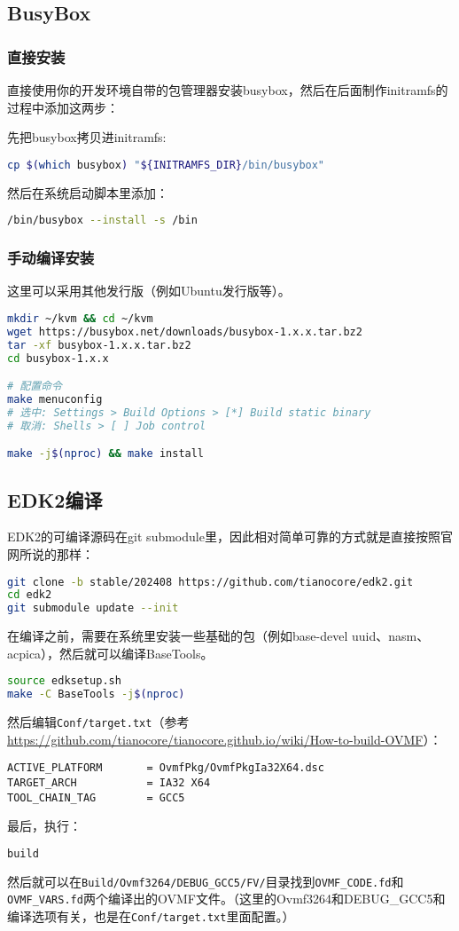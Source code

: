 \subsection{BusyBox}
\subsubsection{直接安装}
直接使用你的开发环境自带的包管理器安装busybox，然后在后面制作initramfs的过程中添加这两步：

先把busybox拷贝进initramfs:
\begin{lstlisting}[language=bash]
cp $(which busybox) "${INITRAMFS_DIR}/bin/busybox"
\end{lstlisting}

然后在系统启动脚本里添加：
\begin{lstlisting}[language=bash]
/bin/busybox --install -s /bin
\end{lstlisting}
\subsubsection{手动编译安装}
这里可以采用其他发行版（例如Ubuntu发行版等）。
\begin{lstlisting}[language=bash]
mkdir ~/kvm && cd ~/kvm
wget https://busybox.net/downloads/busybox-1.x.x.tar.bz2
tar -xf busybox-1.x.x.tar.bz2
cd busybox-1.x.x

# 配置命令
make menuconfig
# 选中: Settings > Build Options > [*] Build static binary
# 取消: Shells > [ ] Job control

make -j$(nproc) && make install
\end{lstlisting}

\subsection{EDK2编译}
EDK2的可编译源码在git submodule里，因此相对简单可靠的方式就是直接按照官网所说的那样：
\begin{lstlisting}[language=bash]
git clone -b stable/202408 https://github.com/tianocore/edk2.git
cd edk2
git submodule update --init
\end{lstlisting}
在编译之前，需要在系统里安装一些基础的包（例如base-devel uuid、nasm、acpica），然后就可以编译BaseTools。
\begin{lstlisting}[language=bash]
source edksetup.sh
make -C BaseTools -j$(nproc)
\end{lstlisting}
然后编辑\texttt{Conf/target.txt}（参考\url{https://github.com/tianocore/tianocore.github.io/wiki/How-to-build-OVMF}）：
\begin{lstlisting}
ACTIVE_PLATFORM       = OvmfPkg/OvmfPkgIa32X64.dsc
TARGET_ARCH           = IA32 X64
TOOL_CHAIN_TAG        = GCC5
\end{lstlisting}
最后，执行：
\begin{lstlisting}[language=bash]
build
\end{lstlisting}
然后就可以在\texttt{Build/Ovmf3264/DEBUG\_GCC5/FV/}目录找到\texttt{OVMF\_CODE.fd}和\texttt{OVMF\_VARS.fd}两个编译出的OVMF文件。（这里的Ovmf3264和DEBUG\_GCC5和编译选项有关，也是在\texttt{Conf/target.txt}里面配置。）

